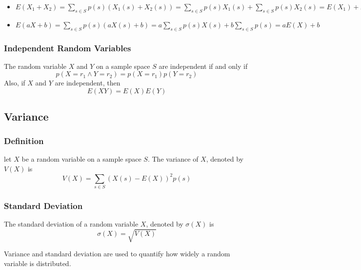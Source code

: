\documentclass{article}
\begin{document}
\begin{tcolorbox}[width=12.1cm]
\begin{itemize}
\item $ E(X_1 + X_2) = \sum_{s \in S}p(s)(X_1(s) + X_2(s)) = \sum_{s \in S}p(s)X_1(s) + \sum_{s \in S}p(s)X_2(s) = E(X_1) + E(X_2) $
\item $ E(aX + b) = \sum_{s \in S}p(s)(aX(s) + b) = a\sum_{s \in S}p(s)X(s) + b\sum_{s \in S}p(s) = aE(X) + b $
\end{itemize}
\end{tcolorbox}

\subsubsection{Independent Random Variables} The random variable $ X $ and $ Y $ on a sample space $ S $ are independent if and only if
\begin{equation}
p(X = r_1 \wedge Y = r_2) = p(X = r_1)p(Y = r_2)
\end{equation}  
Also, if $ X $ and $ Y $ are independent, then
\begin{equation}
E(XY) = E(X)E(Y)
\end{equation}

\subsection{Variance}
\subsubsection{Definition} let $ X $ be a random variable on a sample space $ S $. The variance of $ X $, denoted by $ V(X) $ is
\begin{equation}
V(X) = \sum_{s \in S} (X(s) - E(X))^2p(s)
\end{equation}  

\subsubsection{Standard Deviation} The standard deviation of a random variable $ X $, denoted by $ \sigma(X) $ is
\begin{equation}
\sigma(X) = \sqrt{V(X)}
\end{equation}

\begin{tcolorbox}[width=12.1cm, leftrule=3mm]
Variance and standard deviation are used to quantify how widely a random variable is distributed.
\end{tcolorbox}
\end{document}
